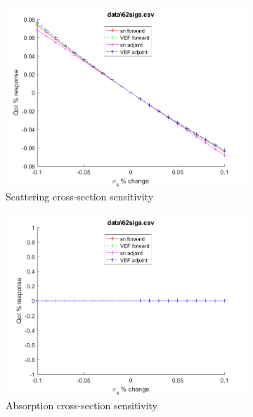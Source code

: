 \documentclass{article}
\begin{document}
\begin{figure}[H]
\begin{subfigure}{.5\textwidth}
  \includegraphics[width=.98\linewidth]{IanProposal/figures2/62sigsSens.png}
  \caption{Scattering cross-section sensitivity}
  \label{fig:sfig2}
\end{subfigure}%
\begin{subfigure}{.5\textwidth}
  \centering
  \includegraphics[width=.98\linewidth]{IanProposal/figures2/62sigaSens.png}
  \caption{Absorption cross-section sensitivity}
  \label{fig:sfig5}
\end{subfigure}%
\caption{}
\label{fig:fig}
\end{figure}
\newpage

\end{document}
